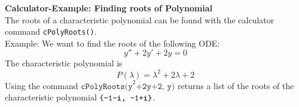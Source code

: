 \textbf{Calculator-Example: Finding roots of Polynomial}\\
The roots of a characteristic polynomial can be found with the calculator command \texttt{cPolyRoots()}.\\
Example: We want to find the roots of the following ODE:
\begin{equation}
  y''+2y'+2y = 0
\end{equation}
The characteristic polynomial is
\begin{equation}
  P(\lambda) = \lambda^2 + 2\lambda + 2
\end{equation}
Using the command $\texttt{cPolyRoots(y}^2 \texttt{+2y+2, y)}$ returns a list of the roots of the characteristic polynomial
$\texttt{\{-1-\textbf{i}, -1+\textbf{i}\}} $.

\newpage
